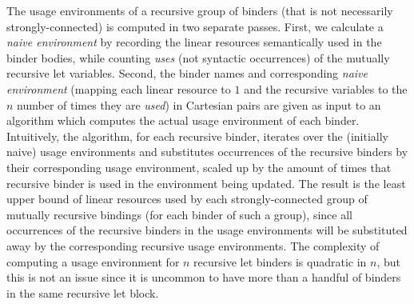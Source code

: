 \documentclass[acmsmall,review]{acmart}
\begin{document}
The usage environments of a recursive group of binders (that is not necessarily
strongly-connected) is computed in two separate passes.
%
First, we calculate a \emph{naive environment} by recording the linear
resources semantically used in the binder bodies, while counting \emph{uses}
(not syntactic occurrences) of the mutually recursive let variables.
%
Second, the binder names and corresponding \emph{naive environment} (mapping
each linear resource to $1$ and the recursive variables to the $n$ number of
times they are \emph{used}) in Cartesian pairs are given as input to
an algorithm which computes the actual usage environment
of each binder.
%
%
Intuitively, the algorithm, for each recursive binder, iterates over the
(initially naive) usage environments and substitutes occurrences of the
recursive binders by their corresponding usage environment,
scaled up by the amount of times that recursive binder is used in the
environment being updated. The result is the least upper bound of linear
resources used by each strongly-connected group of mutually recursive bindings
(for each binder of such a group), since all occurrences of the recursive
binders in the usage environments will be substituted away by the corresponding
recursive usage environments.
%
%
%
%
The complexity of computing a usage environment for $n$ recursive let binders
is quadratic in $n$,
but this is not an issue since it is uncommon to have more than a handful of
binders in the same recursive let block.
\end{document}
